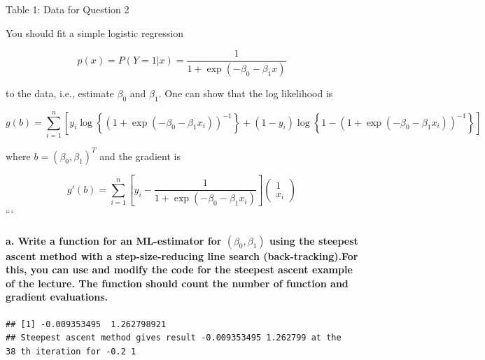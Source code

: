 \documentclass[
]{article}
\begin{document}
Table 1: Data for Question 2

You should fit a simple logistic regression

\[ p(x) = P(Y = 1|x) = \frac{1}{1 + \exp(-\beta_0 - \beta_1 x)} \]

to the data, i.e., estimate \(\beta_0\) and \(\beta_1\). One can show
that the log likelihood is

\[ g(b) = \sum_{i=1}^{n} \left[ y_i \log\left\{(1 + \exp(-\beta_0 - \beta_1 x_i))^{-1}\right\} + (1 - y_i) \log\left\{1 - (1 + \exp(-\beta_0 - \beta_1 x_i))^{-1}\right\} \right] \]

where \(b = (\beta_0, \beta_1)^T\) and the gradient is

\[ g'(b) = \sum_{i=1}^{n} \left[ y_i - \frac{1}{1 + \exp(-\beta_0 - \beta_1 x_i)} \right] \begin{pmatrix} 1 \\ x_i \end{pmatrix} \]
```

\paragraph{\texorpdfstring{a. Write a function for an ML-estimator for
\((\beta_0, \beta_1)\) using the steepest ascent method with a
step-size-reducing line search (back-tracking).For this, you can use and
modify the code for the steepest ascent example of the lecture. The
function should count the number of function and gradient
evaluations.}{a. Write a function for an ML-estimator for (\textbackslash beta\_0, \textbackslash beta\_1) using the steepest ascent method with a step-size-reducing line search (back-tracking).For this, you can use and modify the code for the steepest ascent example of the lecture. The function should count the number of function and gradient evaluations.}}\label{a.-write-a-function-for-an-ml-estimator-for-beta_0-beta_1-using-the-steepest-ascent-method-with-a-step-size-reducing-line-search-back-tracking.for-this-you-can-use-and-modify-the-code-for-the-steepest-ascent-example-of-the-lecture.-the-function-should-count-the-number-of-function-and-gradient-evaluations.}

\begin{verbatim}
## [1] -0.009353495  1.262798921
## Steepest ascent method gives result -0.009353495 1.262799 at the  38 th iteration for -0.2 1
\end{verbatim}
\end{document}

